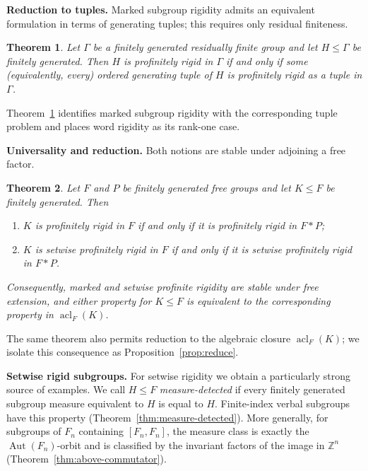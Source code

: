 \documentclass[11pt]{amsart}
\theoremstyle{plain}
\newtheorem{theorem}{Theorem}[section]
\theoremstyle{definition}
\newcommand{\acl}{\operatorname{acl}}
\newcommand{\Aut}{\operatorname{Aut}}
\begin{document}
\medskip\noindent\textbf{Reduction to tuples.}
Marked subgroup rigidity admits an equivalent formulation in terms of generating
tuples; this requires only residual finiteness.
\begin{theorem}\label{thm:tuples}
Let $\Gamma$ be a finitely generated residually finite group and let
$H\le\Gamma$ be finitely generated. Then $H$ is profinitely rigid in $\Gamma$
if and only if some (equivalently, every) ordered generating tuple of $H$ is
profinitely rigid as a tuple in $\Gamma$.
\end{theorem}
Theorem~\ref{thm:tuples} identifies marked subgroup rigidity with the
corresponding tuple problem and places word rigidity as its rank-one case.

\medskip\noindent\textbf{Universality and reduction.}
Both notions are stable under adjoining a free factor.
\begin{theorem}\label{thm:universal}
Let $F$ and $P$ be finitely generated free groups and let $K\le F$ be finitely
generated. Then
\begin{enumerate}
\item[(i)] $K$ is profinitely rigid in $F$ if and only if it is profinitely
  rigid in $F*P$;
\item[(ii)] $K$ is setwise profinitely rigid in $F$ if and only if it is setwise
  profinitely rigid in $F*P$.
\end{enumerate}
Consequently, marked and setwise profinite rigidity are stable under free
extension, and either property for $K\le F$ is equivalent to the corresponding
property in $\acl_F(K)$.
\end{theorem}
The same theorem also permits reduction to the algebraic closure
$\acl_F(K)$; we isolate this consequence as Proposition~\ref{prop:reduce}.

\medskip\noindent\textbf{Setwise rigid subgroups.}
For setwise rigidity we obtain a particularly strong source of examples. We call
$H\le F$ \emph{measure-detected} if every finitely generated subgroup measure
equivalent to $H$ is equal to $H$. Finite-index verbal subgroups have this
property (Theorem~\ref{thm:measure-detected}). More generally, for subgroups of
$F_n$ containing $[F_n,F_n]$, the measure class is exactly the
$\Aut(F_n)$-orbit and is classified by the invariant factors of the image in
$\mathbb Z^n$ (Theorem~\ref{thm:above-commutator}).
\end{document}
